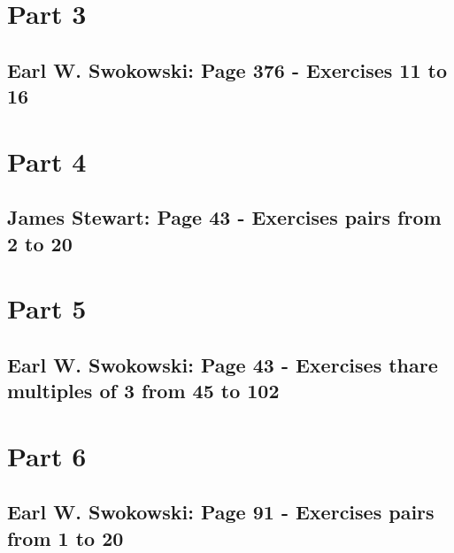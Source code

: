 \documentclass{article}
\begin{document}
\section{Part 3}
\subsection{Earl W. Swokowski: Page 376 - Exercises 11 to 16}

\section{Part 4}
\subsection{James Stewart: Page 43 - Exercises pairs from 2 to 20}

\section{Part 5}
\subsection{Earl W. Swokowski: Page 43 - Exercises thare multiples of 3 from 45 to 102}

\section{Part 6}
\subsection{Earl W. Swokowski: Page 91 - Exercises pairs from 1 to 20}
\end{document}
